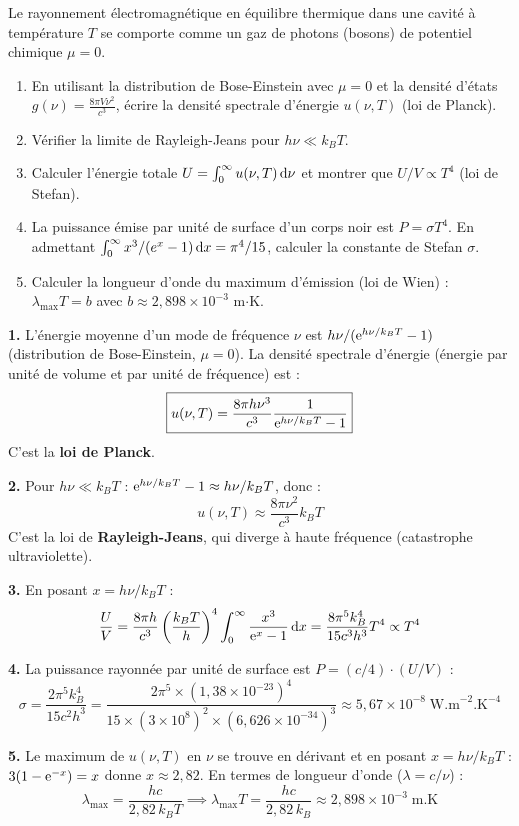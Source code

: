 \documentclass[12pt,a4paper]{article}
\begin{document}
\begin{boiteexercice}
Le rayonnement électromagnétique en équilibre thermique dans une cavité à température $T$ se comporte comme un gaz de photons (bosons) de potentiel chimique $\mu = 0$.
\begin{enumerate}
  \item En utilisant la distribution de Bose-Einstein avec $\mu=0$ et la densité d'états $g(\nu) = \frac{8\pi V\nu^2}{c^3}$, écrire la densité spectrale d'énergie $u(\nu,T)$ (loi de Planck).
  \item Vérifier la limite de Rayleigh-Jeans pour $h\nu\ll k_BT$.
  \item Calculer l'énergie totale $U = \int_0^\infty u(\nu,T)\,\mathrm{d}\nu$ et montrer que $U/V\propto T^4$ (loi de Stefan).
  \item La puissance émise par unité de surface d'un corps noir est $P = \sigma T^4$. En admettant $\int_0^\infty x^3/(e^x-1)\,\mathrm{d} x = \pi^4/15$, calculer la constante de Stefan $\sigma$.
  \item Calculer la longueur d'onde du maximum d'émission (loi de Wien) : $\lambda_{\max}T = b$ avec $b\approx 2{,}898\times10^{-3}$ m$\cdot$K.
\end{enumerate}
\end{boiteexercice}

\begin{boitecorrige}
\textbf{1.} L'énergie moyenne d'un mode de fréquence $\nu$ est $h\nu/(\mathrm{e}^{h\nu/k_BT}-1)$ (distribution de Bose-Einstein, $\mu=0$). La densité spectrale d'énergie (énergie par unité de volume et par unité de fréquence) est :
\[
\boxed{u(\nu,T) = \frac{8\pi h\nu^3}{c^3}\frac{1}{\mathrm{e}^{h\nu/k_BT}-1}}
\]
C'est la \textbf{loi de Planck}.

\textbf{2.} Pour $h\nu\ll k_BT$ : $\mathrm{e}^{h\nu/k_BT}-1\approx h\nu/k_BT$, donc :
\[
u(\nu,T)\approx\frac{8\pi\nu^2}{c^3}k_BT
\]
C'est la loi de \textbf{Rayleigh-Jeans}, qui diverge à haute fréquence (catastrophe ultraviolette).

\textbf{3.} En posant $x = h\nu/k_BT$ :
\[
\frac{U}{V} = \frac{8\pi h}{c^3}\left(\frac{k_BT}{h}\right)^4\int_0^\infty\frac{x^3}{\mathrm{e}^x-1}\,\mathrm{d} x = \frac{8\pi^5 k_B^4}{15c^3h^3}T^4 \propto T^4
\]

\textbf{4.} La puissance rayonnée par unité de surface est $P = (c/4)\cdot(U/V)$ :
\[
\sigma = \frac{2\pi^5 k_B^4}{15c^2h^3} = \frac{2\pi^5\times(1{,}38\times10^{-23})^4}{15\times(3\times10^8)^2\times(6{,}626\times10^{-34})^3}\approx 5{,}67\times10^{-8}\;\text{W.m}^{-2}\text{.K}^{-4}
\]

\textbf{5.} Le maximum de $u(\nu,T)$ en $\nu$ se trouve en dérivant et en posant $x = h\nu/k_BT$ : $3(1-\mathrm{e}^{-x}) = x$ donne $x\approx 2{,}82$. En termes de longueur d'onde ($\lambda = c/\nu$) :
\[
\lambda_{\max} = \frac{hc}{2{,}82\,k_BT} \implies \lambda_{\max}T = \frac{hc}{2{,}82\,k_B}\approx 2{,}898\times10^{-3}\;\text{m.K}
\]
\end{boitecorrige}
\end{document}
